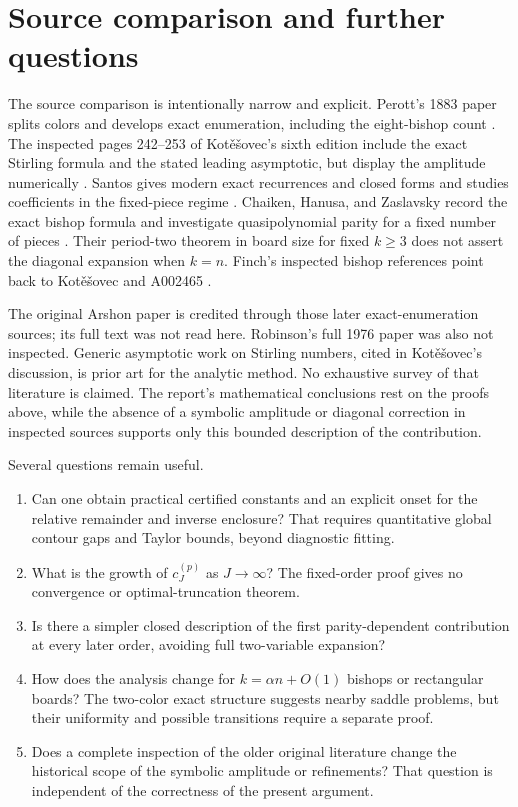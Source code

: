 \documentclass[11pt,letterpaper]{article}
\theoremstyle{remark}\newtheorem{remark}[theorem]{Remark}
\begin{document}
\section{Source comparison and further questions}\label{bsh:sec:sources}
The source comparison is intentionally narrow and explicit. Perott's 1883 paper splits colors and develops exact enumeration, including the eight-bishop count \cite{perott}. The inspected pages 242--253 of Kot\v e\v sovec's sixth edition include the exact Stirling formula and the stated leading asymptotic, but display the amplitude numerically \cite{kotesovec}. Santos gives modern exact recurrences and closed forms and studies coefficients in the fixed-piece regime \cite{santos}. Chaiken, Hanusa, and Zaslavsky record the exact bishop formula and investigate quasipolynomial parity for a fixed number of pieces \cite{favorite,period}. Their period-two theorem in board size for fixed $k\geq3$ does not assert the diagonal expansion when $k=n$. Finch's inspected bishop references point back to Kot\v e\v sovec and A002465 \cite{finch}.

The original Arshon paper is credited through those later exact-enumeration sources; its full text was not read here. Robinson's full 1976 paper was also not inspected. Generic asymptotic work on Stirling numbers, cited in Kot\v e\v sovec's discussion, is prior art for the analytic method. No exhaustive survey of that literature is claimed. The report's mathematical conclusions rest on the proofs above, while the absence of a symbolic amplitude or diagonal correction in inspected sources supports only this bounded description of the contribution.

Several questions remain useful.
\begin{enumerate}
\item Can one obtain practical certified constants and an explicit onset for the relative remainder and inverse enclosure? That requires quantitative global contour gaps and Taylor bounds, beyond diagnostic fitting.
\item What is the growth of $c_J^{(p)}$ as $J\to\infty$? The fixed-order proof gives no convergence or optimal-truncation theorem.
\item Is there a simpler closed description of the first parity-dependent contribution at every later order, avoiding full two-variable expansion?
\item How does the analysis change for $k=\alpha n+O(1)$ bishops or rectangular boards? The two-color exact structure suggests nearby saddle problems, but their uniformity and possible transitions require a separate proof.
\item Does a complete inspection of the older original literature change the historical scope of the symbolic amplitude or refinements? That question is independent of the correctness of the present argument.
\end{enumerate}
\end{document}
